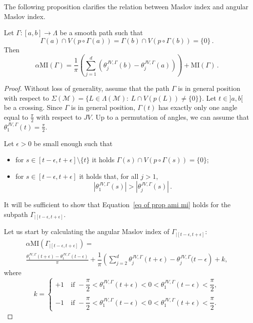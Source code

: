 \documentclass[AHL, Unicode, longabstracts, published]{cedram}
\newcommand*\M{\mathcal{M}}
\newcommand{\MI}{\mathrm{MI}}
\begin{document}
The following proposition clarifies the relation between Maslov index and angular Maslov index.

\begin{prop}\label{lemma relation MI et AMI}
Let $\Gamma:[a,b]\to \Lambda$ be a smooth path such that
\[
\Gamma(a)\cap V(p\circ\Gamma(a))=\Gamma(b)\cap V(p\circ\Gamma(b))=\{0\}\,.
\]
Then
\begin{equation}\label{eq of prop ami mi}
\alpha\MI(\Gamma)=\frac{1}{\pi}\left(\sum_{j=1}^d(\theta_j^{JV,\Gamma}(b)-\theta_j^{JV,\Gamma}(a)) \right)+\MI(\Gamma)\,.
\end{equation}
\end{prop}

\begin{proof}
Without loss of generality, assume that the path $\Gamma$ is in general position with respect to $\Sigma(\M)=\{L\in\Lambda(\M) :\ L\cap V(p(L))\neq \{0\}\}$. Let $t\in]a,b[$ be a crossing. Since $\Gamma$ is in general position, $\Gamma(t)$ has exactly only one angle equal to $\frac{\pi}{2}$ with respect to $JV$. Up to a permutation of angles, we can assume that $\theta_1^{JV,\Gamma}(t)=\frac{\pi}{2}$.


Let $\epsilon>0$ be small enough such that
\begin{itemize}
\item for $s\in[t-\epsilon,t+\epsilon]\setminus\{t\}$ it holds $\Gamma(s)\cap V(p\circ\Gamma(s))=\{0\}$;
\item for $s\in[t-\epsilon,t+\epsilon]$ it holds that, for all $j>1$,
\[
\left|\theta^{JV,\Gamma}_1(s)\right|>\left|\theta_j^{JV,\Gamma}(s)\right|\,.
\]
\end{itemize}
It will be sufficient to show that Equation~\ref{eq of prop ami mi} holds for the subpath $\Gamma_{|[t-\epsilon,t+\epsilon]}$.



Let us start by calculating the angular Maslov index of $\Gamma_{|[t-\epsilon,t+\epsilon]}$:
\begin{multline*}
\alpha\MI\left(\Gamma_{|[t-\epsilon,t+\epsilon]}\right)=
\\
\frac{\theta_1^{JV,\Gamma}(t+\epsilon)-\theta_1^{JV,\Gamma}(t-\epsilon)}{\pi}+\dfrac{1}{\pi}\left(\sum_{j=2}^d\theta_j^{JV,\Gamma}(t+\epsilon)-\theta_j^{JV,\Gamma}(t-\epsilon\right)+k,
\end{multline*}
where
\[
k=
\begin{cases}
+1\quad\text{if }-\dfrac{\pi}{2}<\theta_1^{JV,\Gamma}(t+\epsilon)<0<\theta_1^{JV,\Gamma}(t-\epsilon)<\dfrac{\pi}{2},\\
\\
-1\quad\text{if }-\dfrac{\pi}{2}<\theta_1^{JV,\Gamma}(t-\epsilon)<0<\theta_1^{JV,\Gamma}(t+\epsilon)<\dfrac{\pi}{2}.
\end{cases}
\]



\end{proof}
\end{document}
